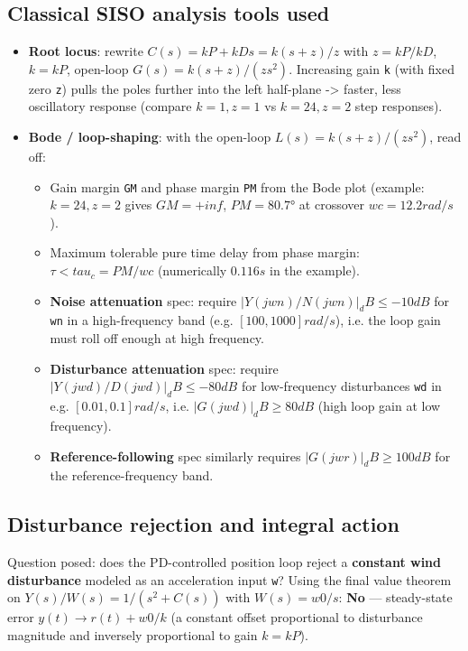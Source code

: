 \documentclass[11pt]{article}
\begin{document}
\subsection{Classical SISO analysis tools used}
\begin{itemize}
\item \textbf{Root locus}: rewrite $C(s) = kP + kD s = k (s+z)/z$ with $z = kP/kD$, $k = kP$, open-loop $G(s) = k (s+z)/(z s^2)$. Increasing gain \texttt{k} (with fixed zero \texttt{z}) pulls the poles further into the left half-plane -> faster, less oscillatory response (compare $k=1,z=1$ vs $k=24,z=2$ step responses).
\item \textbf{Bode / loop-shaping}: with the open-loop $L(s) = k (s+z)/(z s^2)$, read off:
\begin{itemize}
\item Gain margin \texttt{GM} and phase margin \texttt{PM} from the Bode plot (example: $k=24, z=2$ gives $GM = +inf$, $PM = 80.7°$ at crossover $wc = 12.2 rad/s$).
\item Maximum tolerable pure time delay from phase margin: $\tau < tau_c = PM / wc$ (numerically $0.116 s$ in the example).
\item \textbf{Noise attenuation} spec: require $|Y(jwn)/N(jwn)|_dB \le  -10 dB$ for \texttt{wn} in a high-frequency band (e.g. $[100, 1000] rad/s$), i.e. the loop gain must roll off enough at high frequency.
\item \textbf{Disturbance attenuation} spec: require $|Y(jwd)/D(jwd)|_dB \le  -80 dB$ for low-frequency disturbances \texttt{wd} in e.g. $[0.01, 0.1] rad/s$, i.e. $|G(jwd)|_dB \ge  80 dB$ (high loop gain at low frequency).
\item \textbf{Reference-following} spec similarly requires $|G(jwr)|_dB \ge  100 dB$ for the reference-frequency band.
\end{itemize}
\end{itemize}

\subsection{Disturbance rejection and integral action}
Question posed: does the PD-controlled position loop reject a \textbf{constant wind disturbance} modeled as an acceleration input \texttt{w}? Using the final value theorem on $Y(s)/W(s) = 1/(s^2+C(s))$ with $W(s) = w0/s$: \textbf{No} — steady-state error $y (t) \to  r(t) + w0/k$ (a constant offset proportional to disturbance magnitude and inversely proportional to gain $k = kP$).
\end{document}
